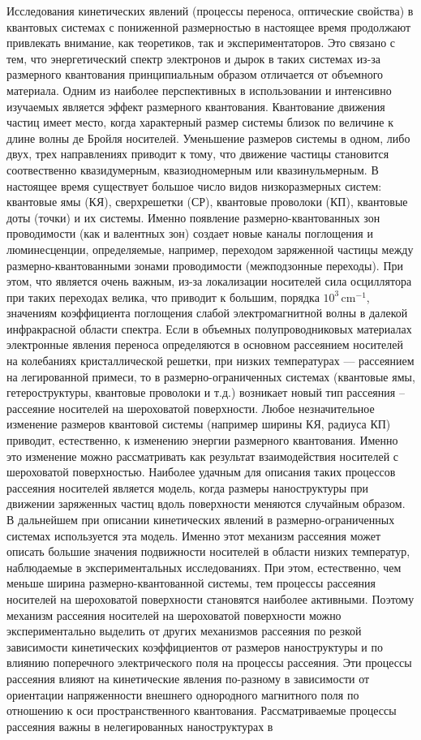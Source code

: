 {\actuality}
Исследования кинетических явлений (процессы переноса, оптические свойства) в квантовых системах с пониженной размерностью в настоящее время продолжают привлекать внимание, как теоретиков, так и экспериментаторов. Это связано с тем, что энергетический спектр электронов и дырок в таких системах из-за размерного квантования принципиальным образом отличается от объемного материала. Одним из наиболее перспективных в использовании и интенсивно изучаемых является эффект размерного квантования. Квантование движения частиц имеет место, когда характерный размер системы близок по величине к длине волны де Бройля носителей. Уменьшение размеров системы в одном, либо двух, трех направлениях приводит к тому, что движение частицы становится соотвественно квазидумерным, квазиодномерным или квазинульмерным. В настоящее время существует большое число видов низкоразмерных систем: квантовые ямы (КЯ), сверхрешетки (СР), квантовые проволоки (КП), квантовые доты (точки) и их системы. Именно появление размерно-квантованных зон проводимости (как и валентных зон) создает новые каналы поглощения и люминесценции, определяемые, например, переходом заряженной частицы между размерно-квантованными зонами проводимости (межподзонные переходы). При этом, что является очень важным, из-за локализации носителей сила осциллятора при таких переходах велика, что приводит к большим, порядка $10^3\,\text{cm}^{-1}$, значениям коэффициента поглощения слабой электромагнитной волны в далекой инфракрасной области спектра. Если в объемных полупроводниковых материалах электронные явления переноса определяются в основном рассеянием носителей на колебаниях кристаллической решетки, при низких температурах --- рассеянием на легированной примеси, то в размерно-ограниченных системах (квантовые ямы, гетероструктуры, квантовые проволоки и т.д.) возникает новый тип рассеяния – рассеяние носителей на шероховатой поверхности. Любое незначительное изменение размеров квантовой системы (например ширины КЯ, радиуса КП) приводит, естественно, к изменению энергии размерного квантования. Именно это изменение можно рассматривать как результат взаимодействия носителей с шероховатой поверхностью. Наиболее удачным для описания таких процессов рассеяния носителей является модель, когда размеры наноструктуры при движении заряженных частиц вдоль поверхности меняются случайным образом. В дальнейшем при описании кинетических явлений в размерно-ограниченных системах используется эта модель. Именно этот механизм рассеяния может описать большие значения подвижности носителей в области низких температур, наблюдаемые в экспериментальных исследованиях. При этом, естественно, чем меньше ширина размерно-квантованной системы, тем процессы рассеяния носителей на шероховатой поверхности становятся наиболее активными. Поэтому механизм рассеяния носителей на шероховатой поверхности можно экспериментально выделить от других механизмов рассеяния по резкой зависимости кинетических коэффициентов от размеров наноструктуры и по влиянию поперечного электрического поля на процессы рассеяния. Эти процессы рассеяния влияют на кинетические явления по-разному в зависимости от ориентации напряженности внешнего однородного магнитного поля по отношению к оси пространственного квантования. Рассматриваемые процессы рассеяния важны в нелегированных наноструктурах в 